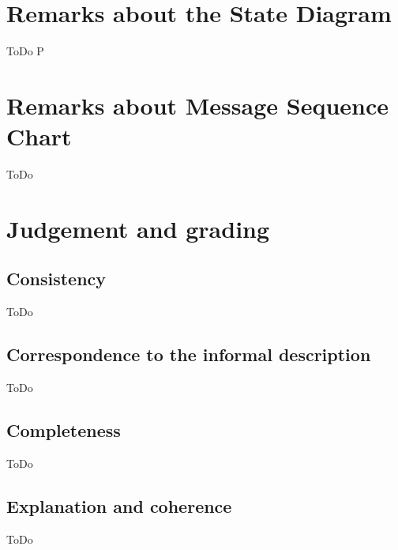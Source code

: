 \documentclass[a4paper,11pt]{article}
\begin{document}
	\section{Remarks about the State Diagram}
    ToDo
P
    \section{Remarks about Message Sequence Chart}
    ToDo

    \section{Judgement and grading}
    \subsection{Consistency}
    ToDo

    \subsection{Correspondence to the informal description}
    ToDo

    \subsection{Completeness}
    ToDo

    \subsection{Explanation and coherence}
    ToDo
\end{document}
